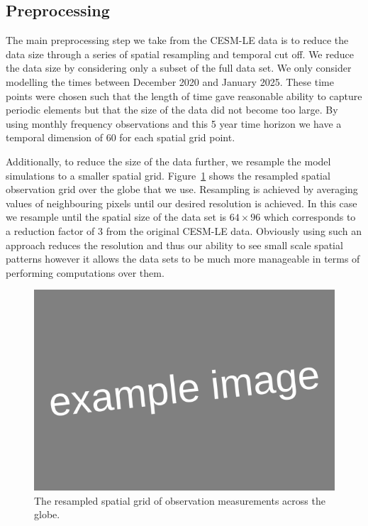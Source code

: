  \subsection{Preprocessing \label{sec:preprocessing}}
 The main preprocessing step we take from the CESM-LE data is to reduce the data size through a series of spatial resampling and temporal cut off.
 We reduce the data size by considering only a subset of the full data set.
 We only consider modelling the times between December 2020 and January 2025.
 These time points were chosen such that the length of time gave reasonable ability to capture periodic elements but that the size of the data did not become too large.
 By using monthly frequency observations and this 5 year time horizon we have a temporal dimension of 60 for each spatial grid point. 
 
  Additionally, to reduce the size of the data further, we resample the model simulations to a smaller spatial grid.
  Figure~\ref{fig:cesm_grid} shows the resampled spatial observation grid over the globe that we use.
  Resampling is achieved by averaging values of neighbouring pixels until our desired resolution is achieved.
  In this case we resample until the spatial size of the data set is $64 \times 96$ which corresponds to a reduction factor of $3$ from the original CESM-LE data.
  Obviously using such an approach reduces the resolution and thus our ability to see small scale spatial patterns however it allows the data sets to be much more manageable in terms of performing computations over them.  
 
 \begin{figure}[htbp!] 
 	\centering    
 	\includegraphics[width=1.0\textwidth]{Example_image}
 	\caption[CESM-LE resampled spatial grid]{The resampled spatial grid of observation measurements across the globe.}
 	\label{fig:cesm_grid}
 \end{figure}

